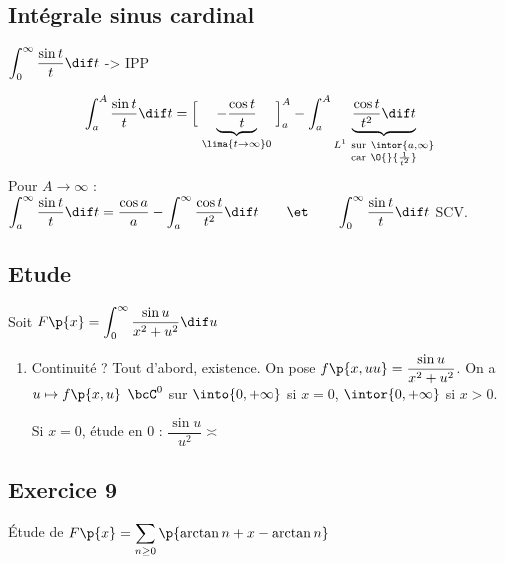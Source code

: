 \documentclass[a4paper,french,bookmarks]{book}
\begin{document}
    \subsection*{Intégrale sinus cardinal}
    
    $\displaystyle\int_0^\infty \dfrac{\sin t}{t}\dif t$ -> IPP
    
    \[ \int_a^A \dfrac{\sin t}{t}\dif t = \left[\vphantom{\dfrac{a}{b}}\right.\underbrace{- \dfrac{\cos t}{t}}_{\lima{t \to \infty} 0}\left.\vphantom{\dfrac{a}{b}}\right]_a^A - \int_a^A \underbrace{\dfrac{\cos t}{t^2}\dif t}_{\substack{L^1 \ \text{sur} \ \intor{a, \infty}\\ \text{car} \ \O{}{\frac{1}{t^2}}}}\]
    Pour $A \to \infty$ : \qquad $\displaystyle \int_a^\infty \dfrac{\sin t}{t}\dif t = \dfrac{\cos a}{a} - \int_a^\infty \dfrac{\cos t}{t^2}\dif t \qquad\et\qquad \int_0^\infty \dfrac{\sin t}{t}\dif t$ SCV.
    
    

    
    \subsection{Etude}
    
    Soit $F\p{x} = \displaystyle\int_0^\infty \dfrac{\sin u}{x^2 + u^2}\dif u$
    
    \begin{enumerate}
        \item Continuité ? Tout d'abord, existence. On pose $f\p{x, uu} = \dfrac{\sin u}{x^2 + u^2}$. On a $u \mapsto f\p{x, u}$ $\bcC^0$ sur $\into{0, +\infty}$ si $x = 0$, $\intor{0, +\infty}$ si $x > 0$.
        
        \begin{enumerate}
            \ithand Si $x = 0$, étude en $0$ : $\dfrac{\sin u}{u^2} \asymp $
        \end{enumerate}
    \end{enumerate}
    
    \newpage
    
    \subsection*{Exercice 9}
    
    Étude de $F\p{x} = \displaystyle\sum_{n \geq 0} \p{\arctan{n + x} - \arctan{n}}$
    
\end{document}
